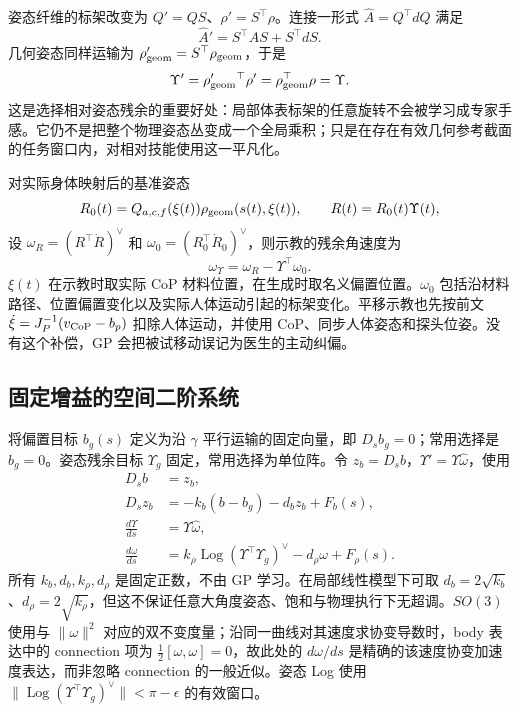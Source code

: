 \documentclass[11pt,a4paper]{article}
\numberwithin{equation}{section}
\theoremstyle{definition}
\begin{document}
姿态纤维的标架改变为 $Q'=QS$、$\rho'=S^\top\rho$。连接一形式 $\widehat A=Q^\top dQ$ 满足
\begin{equation}
 \widehat A'=S^\top\widehat A S+S^\top dS.
 \label{eq:v43-gauge-connection}
\end{equation}
几何姿态同样运输为 $\rho_{\rm geom}'=S^\top\rho_{\rm geom}$，于是
\begin{equation}
 \Upsilon'=\rho_{\rm geom}'{}^\top\rho'
 =\rho_{\rm geom}^\top\rho=\Upsilon.
 \label{eq:v43-invariant-residual}
\end{equation}
这是选择相对姿态残余的重要好处：局部体表标架的任意旋转不会被学习成专家手感。它仍不是把整个物理姿态丛变成一个全局乘积；只是在存在有效几何参考截面的任务窗口内，对相对技能使用这一平凡化。

对实际身体映射后的基准姿态
\begin{equation}
 R_0(t)=Q_{a,c,f}(\xi(t))\rho_{\rm geom}(s(t),\xi(t)),\qquad
 R(t)=R_0(t)\Upsilon(t),
\end{equation}
设 $\omega_R=(R^\top\dot R)^\vee$ 和 $\omega_0=(R_0^\top\dot R_0)^\vee$，则示教的残余角速度为
\begin{equation}
 \omega_\Upsilon=\omega_R-\Upsilon^\top\omega_0.
 \label{eq:v43-human-angle-compensation}
\end{equation}
$\xi(t)$ 在示教时取实际 CoP 材料位置，在生成时取名义偏置位置。$\omega_0$ 包括沿材料路径、位置偏置变化以及实际人体运动引起的标架变化。平移示教也先按前文 $\dot\xi=J_P^{-1}(v_{\rm CoP}-b_p)$ 扣除人体运动，并使用 CoP、同步人体姿态和探头位姿。没有这个补偿，GP 会把被试移动误记为医生的主动纠偏。

\subsection{固定增益的空间二阶系统}
将偏置目标 $b_g(s)$ 定义为沿 $\gamma$ 平行运输的固定向量，即 $D_sb_g=0$；常用选择是 $b_g=0$。姿态残余目标 $\Upsilon_g$ 固定，常用选择为单位阵。令 $z_b=D_sb$，$\Upsilon'=\Upsilon\widehat\omega$，使用
\begin{align}
 D_sb&=z_b,\\
 D_sz_b&=-k_b(b-b_g)-d_bz_b+F_b(s),\\
 \frac{d\Upsilon}{ds}&=\Upsilon\widehat\omega,\\
 \frac{d\omega}{ds}
 &=k_\rho\operatorname{Log}(\Upsilon^\top\Upsilon_g)^\vee
   -d_\rho\omega+F_\rho(s).
 \label{eq:v43-space-generator}
\end{align}
所有 $k_b,d_b,k_\rho,d_\rho$ 是固定正数，不由 GP 学习。在局部线性模型下可取 $d_b=2\sqrt{k_b}$、$d_\rho=2\sqrt{k_\rho}$，但这不保证任意大角度姿态、饱和与物理执行下无超调。$SO(3)$ 使用与 $\|\omega\|^2$ 对应的双不变度量；沿同一曲线对其速度求协变导数时，body 表达中的 connection 项为 $\tfrac12[\omega,\omega]=0$，故此处的 $d\omega/ds$ 是精确的该速度协变加速度表达，而非忽略 connection 的一般近似。姿态 Log 使用 $\|\operatorname{Log}(\Upsilon^\top\Upsilon_g)^\vee\|<\pi-\epsilon$ 的有效窗口。
\end{document}
